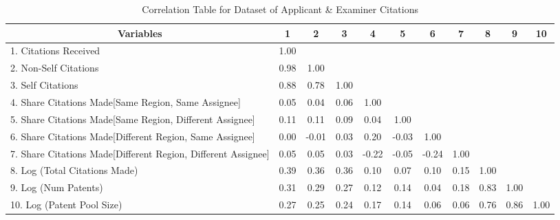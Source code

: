 
\begin{center}
\begin{table}[htbp]\centering \caption{Correlation Table for Dataset of Applicant \& Examiner Citations \label{ae.corrtable}}
\scriptsize
\singlespacing
\begin{adjustbox}{angle=0}
\begin{tabular}{l  c  c  c  c  c  c  c  c  c  c }

\hline
\multicolumn{1}{c}{Variables} &1&2&3&4&5&6&7&8&9&10\\ \hline
1. Citations Received&1.00\\
2. Non-Self Citations&0.98&1.00\\
3. Self Citations&0.88&0.78&1.00\\
4. Share Citations Made[Same Region, Same Assignee]&0.05&0.04&0.06&1.00\\
5. Share Citations Made[Same Region, Different Assignee]&0.11&0.11&0.09&0.04&1.00\\
6. Share Citations Made[Different Region, Same Assignee]&0.00&-0.01&0.03&0.20&-0.03&1.00\\
7. Share Citations Made[Different Region, Different Assignee]&0.05&0.05&0.03&-0.22&-0.05&-0.24&1.00\\
8. Log (Total Citations Made)&0.39&0.36&0.36&0.10&0.07&0.10&0.15&1.00\\
9. Log (Num Patents)&0.31&0.29&0.27&0.12&0.14&0.04&0.18&0.83&1.00\\
10. Log (Patent Pool Size)&0.27&0.25&0.24&0.17&0.14&0.06&0.06&0.76&0.86&1.00\\ \hline
\end{tabular}
\end{adjustbox}
\end{table}
\end{center}
